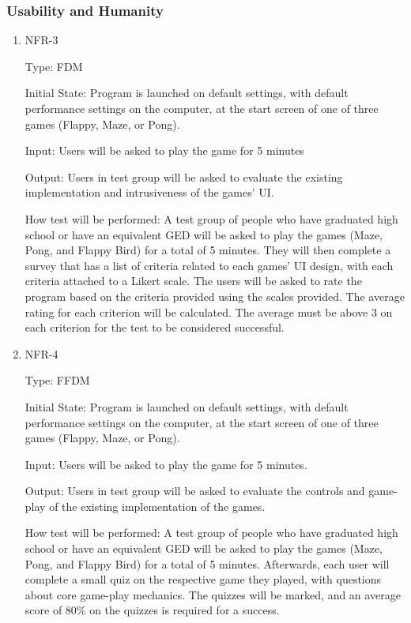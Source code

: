 \documentclass[12pt, titlepage]{article}
\begin{document}
\subsubsection{Usability and Humanity}

\begin{enumerate}

\item{NFR-3\\}

Type: FDM
					
Initial State: Program is launched on default settings, with default performance settings on the computer, at the start screen of one of three games (Flappy, Maze, or Pong).
					
Input: Users will be asked to play the game for 5 minutes
					
Output: Users in test group will be asked to evaluate the existing implementation and intrusiveness of the games' UI.

How test will be performed: A test group of people who have graduated high school or have an equivalent GED will be asked to play the games (Maze, Pong, and Flappy Bird) for a total of 5 minutes. They will then complete a survey that has a list of criteria related to each games' UI design, with each criteria attached to a Likert scale. The users will be asked to rate the program based on the criteria provided using the scales provided.  The average rating for each criterion will be calculated. The average must be above 3 on each criterion for the test to be considered successful. 



\item{NFR-4\\}

Type: FFDM
					
Initial State: Program is launched on default settings, with default performance settings on the computer, at the start screen of one of three games (Flappy, Maze, or Pong).
					
Input: Users will be asked to play the game for 5 minutes.
					
Output: Users in test group will be asked to evaluate the controls and game-play of the existing implementation of the games.

How test will be performed: A test group of people who have graduated high school or have an equivalent GED will be asked to play the games (Maze, Pong, and Flappy Bird) for a total of 5 minutes. Afterwards, each user will complete a small quiz on the respective game they played, with questions about core game-play mechanics. The quizzes will be marked, and an average score of 80\% on the quizzes is required for a success.


\end{enumerate}
\end{document}
